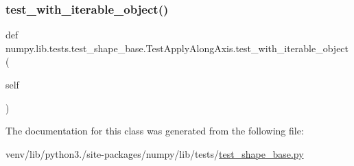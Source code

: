 \subsubsection{\texorpdfstring{test\+\_\+with\+\_\+iterable\+\_\+object()}{test\_with\_iterable\_object()}}
{\footnotesize\ttfamily def numpy.\+lib.\+tests.\+test\+\_\+shape\+\_\+base.\+Test\+Apply\+Along\+Axis.\+test\+\_\+with\+\_\+iterable\+\_\+object (\begin{DoxyParamCaption}\item[{}]{self }\end{DoxyParamCaption})}



The documentation for this class was generated from the following file\+:\begin{DoxyCompactItemize}
\item 
venv/lib/python3./site-\/packages/numpy/lib/tests/\hyperlink{lib_2tests_2test__shape__base_8py}{test\+\_\+shape\+\_\+base.\+py}\end{DoxyCompactItemize}
